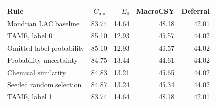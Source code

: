 \begin{tabular}{lrrrr}\toprule
Rule & $C_{\min}$ & $E_0$ & MacroCSY & Deferral \\
\midrule
Mondrian LAC baseline & 83.74 & 14.64 & 48.18 & 42.01 \\
TAME, label 0 & 85.10 & 12.93 & 46.57 & 44.02 \\
Omitted-label probability & 85.10 & 12.93 & 46.57 & 44.02 \\
Probability uncertainty & 84.75 & 13.44 & 44.61 & 44.02 \\
Chemical similarity & 84.83 & 13.21 & 45.65 & 44.02 \\
Seeded random selection & 84.87 & 13.24 & 45.34 & 44.02 \\
TAME, label 1 & 83.74 & 14.64 & 48.18 & 42.01 \\
\bottomrule\end{tabular}
